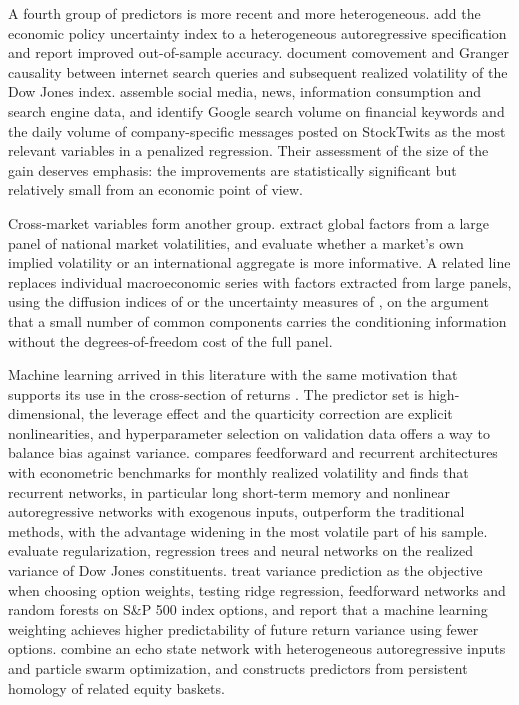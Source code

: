 \documentclass[preprint,12pt,authoryear]{elsarticle}
\begin{document}
A fourth group of predictors is more recent and more heterogeneous. \citet{liuzhang2015} add the economic policy uncertainty index to a heterogeneous autoregressive specification and report improved out-of-sample accuracy. \citet{dimpfljank2016} document comovement and Granger causality between internet search queries and subsequent realized volatility of the Dow Jones index. \citet{audrinosigristballinari2020} assemble social media, news, information consumption and search engine data, and identify Google search volume on financial keywords and the daily volume of company-specific messages posted on StockTwits as the most relevant variables in a penalized regression. Their assessment of the size of the gain deserves emphasis: the improvements are statistically significant but relatively small from an economic point of view.

Cross-market variables form another group. \citet{zhangmaliao2020} extract global factors from a large panel of national market volatilities, and \citet{liangweizhang2020} evaluate whether a market's own implied volatility or an international aggregate is more
informative. A related line replaces individual macroeconomic series with factors extracted from large panels, using the diffusion indices of \citet{ludvigsonng2009} or the uncertainty measures of \citet{juradoludvigsonng2015}, on the argument that a small number of common components carries the conditioning information without the degrees-of-freedom cost of the full panel.

Machine learning arrived in this literature with the same motivation that supports its use in the cross-section of returns \citep{gukellyxiu2020}. The predictor set is high-dimensional, the leverage effect and the quarticity
correction are explicit nonlinearities, and hyperparameter selection on validation data offers a way to balance bias against variance.
\citet{bucci2020} compares feedforward and recurrent architectures with econometric benchmarks for monthly realized volatility and finds that recurrent networks, in particular long short-term memory and nonlinear autoregressive networks with exogenous inputs, outperform the traditional methods, with the advantage widening in the most volatile part of his sample. \citet{christensensiggaardveliyev2023} evaluate regularization, regression trees and neural networks on the realized variance of Dow Jones constituents.
\citet{carrwuzhang2020} treat variance prediction as the objective when choosing option weights, testing ridge regression, feedforward networks and random forests on S\&P 500 index options, and report that a machine learning weighting
achieves higher predictability of future return variance using fewer options.
\citet{ribeiro2021} combine an echo state network with heterogeneous autoregressive inputs and particle swarm optimization, and \citet{souto2023} constructs predictors from persistent homology of related equity baskets.
\end{document}
